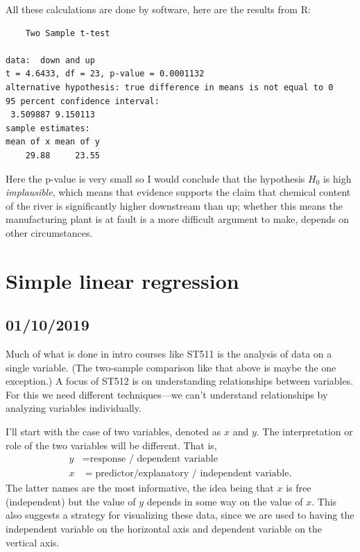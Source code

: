 \documentclass[a4paper, 12pt]{article}
\theoremstyle{plain}
\theoremstyle{definition}
\theoremstyle{remark}
\begin{document}
All these calculations are done by software, here are the results from R:
{\small
\begin{verbatim}
	Two Sample t-test

data:  down and up
t = 4.6433, df = 23, p-value = 0.0001132
alternative hypothesis: true difference in means is not equal to 0
95 percent confidence interval:
 3.509887 9.150113
sample estimates:
mean of x mean of y 
    29.88     23.55 
\end{verbatim}
}
Here the p-value is very small so I would conclude that the hypothesis $H_0$ is high {\em implausible}, which means that evidence supports the claim that chemical content of the river is significantly higher downstream than up; whether this means the manufacturing plant is at fault is a more difficult argument to make, depends on other circumstances.  

\vfill

\pagebreak

\section{Simple linear regression}

\subsection*{01/10/2019}

Much of what is done in intro courses like ST511 is the analysis of data on a single variable.  (The two-sample comparison like that above is maybe the one exception.)  A focus of ST512 is on understanding relationships between  variables.  For this we need different techniques---we can't understand relationships by analyzing variables individually.  

I'll start with the case of two variables, denoted as $x$ and $y$.  The interpretation or role of the two variables will be different.  That is, 
\begin{align*}
y & = \text{response / dependent variable} \\
x & = \text{predictor/explanatory / independent variable}.
\end{align*}
The latter names are the most informative, the idea being that $x$ is free (independent) but the value of $y$ depends in some way on the value of $x$.  This also suggests a strategy for visualizing these data, since we are used to having the independent variable on the horizontal axis and dependent variable on the vertical axis.  
\end{document}

